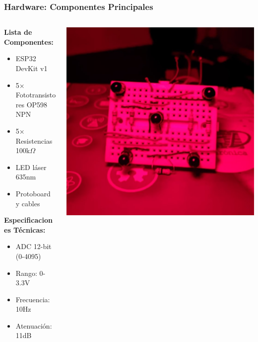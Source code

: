 \documentclass[xcolor=dvipsnames]{beamer}
\begin{document}
\begin{frame}
    \frametitle{Hardware: Componentes Principales}
    \begin{columns}
        \begin{column}{0.5\textwidth}
            \textbf{Lista de Componentes:}
            \begin{itemize}
                \item ESP32 DevKit v1
                \item 5× Fototransistores OP598 NPN
                \item 5× Resistencias 100k$\Omega$
                \item LED láser 635nm
                \item Protoboard y cables
            \end{itemize}
            
            \vspace{0.5cm}
            \textbf{Especificaciones Técnicas:}
            \begin{itemize}
                \item ADC 12-bit (0-4095)
                \item Rango: 0-3.3V
                \item Frecuencia: 10Hz
                \item Atenuación: 11dB
            \end{itemize}
        \end{column}
        \begin{column}{0.5\textwidth}
            \begin{center}
                \includegraphics[width=\textwidth]{../assets/difu.jpeg}
                

\end{center}
\end{column}
\end{columns}
\end{frame}
\end{document}
